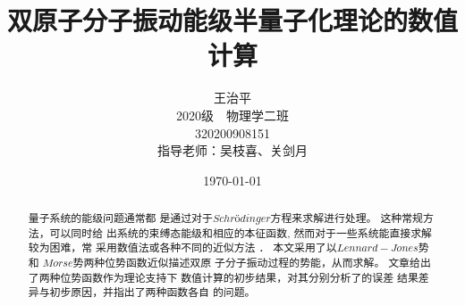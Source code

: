 \documentclass[11pt, a4paper, oneside]{ctexart}
\title{\textbf{双原子分子振动能级半量子化理论的数值计算}}
\author{{王治平} 
\\\vspace{-6mm}
\small{2020级\ \ 物理学二班}
\\\small{320200908151}
\\{指导老师：吴枝喜、关剑月}}
\date{\today}
\begin{document}
\maketitle
	

    \maketitle

    \setcounter{page}{0}
    \maketitle
    \thispagestyle{empty}
    ~\\~\\~\\

\maketitle

\setcounter{page}{0}
\maketitle
\thispagestyle{empty}

\begin{abstract}
    {
        量子系统的能级问题通常都
        是通过对于$Schrödinger$方程来求解进行处理。
        这种常规方法，可以同时给
        出系统的束缚态能级和相应的本征函数,
        然而对于一些系统能直接求解较为困难，常
        采用数值法或各种不同的近似方法 ．
        本文采用了以$Lennard-Jones$势和
        $Morse$势两种位势函数近似描述双原
        子分子振动过程的势能，从而求解。
        文章给出了两种位势函数作为理论支持下
        数值计算的初步结果，对其分别分析了的误差
        结果差异与初步原因，并指出了两种函数各自
        的问题。


    }
\end{abstract}
\end{document}
